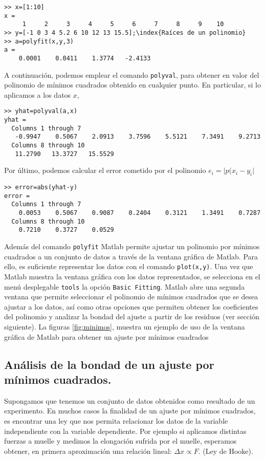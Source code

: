 \begin{verbatim}>> x=[1:10]
x =
     1     2     3     4     5     6     7     8     9    10
>> y=[-1 0 3 4 5.2 6 10 12 13 15.5];\index{Raíces de un polinomio}
>> a=polyfit(x,y,3)
a =
    0.0001    0.0411    1.3774   -2.4133
\end{verbatim}
A continuación, podemos emplear el comando \texttt{polyval}, para obtener en valor del polinomio de mínimos cuadrados obtenido en cualquier punto. En particular, si lo aplicamos a los datos $x$,

\begin{verbatim}
>> yhat=polyval(a,x)
yhat =
  Columns 1 through 7
   -0.9947    0.5067    2.0913    3.7596    5.5121    7.3491    9.2713
  Columns 8 through 10
   11.2790   13.3727   15.5529
\end{verbatim}

Por último, podemos calcular el error cometido por el polinomio $e_i=\vert p(x_i-y_i \vert$
\begin{verbatim}
>> error=abs(yhat-y)
error =
  Columns 1 through 7
    0.0053    0.5067    0.9087    0.2404    0.3121    1.3491    0.7287
  Columns 8 through 10
    0.7210    0.3727    0.0529
\end{verbatim} 
Además del comando \texttt{polyfit} Matlab permite ajustar un polinomio por mínimos cuadrados a un conjunto de datos a través de la ventana gráfica de Matlab. Para ello, es suficiente representar los datos con el comando \texttt{plot(x,y)}. Una vez que Matlab muestra la ventana gráfica con los datos representados, se selecciona en el menú desplegable \texttt{tools} la opción \texttt{Basic Fitting}. Matlab abre una segunda ventana que permite seleccionar el polinomio de mínimos cuadrados que se desea ajustar a los datos, así como otras opciones que permiten obtener los coeficientes del polinomio y analizar la bondad del ajuste a partir de los residuos (ver sección siguiente). La figuras \ref{fig:minimos}, muestra un ejemplo de uso de la ventana gráfica de Matlab para obtener un ajuste por mínimos cuadrados 


\subsection{Análisis de la bondad de un ajuste por mínimos cuadrados.} 
Supongamos que tenemos un conjunto de datos obtenidos como resultado de un experimento. En muchos casos la finalidad de un ajuste por mínimos cuadrados, es encontrar una ley que nos permita relacionar los datos de la variable independiente con la variable dependiente. Por ejemplo si aplicamos distintas fuerzas a muelle y medimos la elongación sufrida por el muelle, esperamos obtener, en primera aproximación una relación lineal: $\Delta x\propto F$. (Ley de Hooke). 

